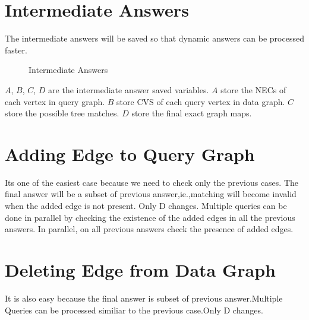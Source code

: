 \section{Intermediate Answers}
	\hspace{10mm}The intermediate answers will be saved so that dynamic answers can be processed faster.
	\begin{figure}[h]
 \centering
{}

 \caption{Intermediate Answers}
\end{figure}
	 $A$, $B$, $C$, $D$ are the intermediate answer saved variables. $A$ store the NECs of each vertex in query graph. $B$ store CVS of each query vertex in data graph. $C$ store the possible tree matches. $D$ store the final exact graph maps.
\section{Adding Edge to Query Graph}
 \label{sec:aq}
	\hspace{10mm} Its one of the easiest case because we need to check only the previous cases. The final answer will be a subset of previous answer,ie.,matching will become invalid when the added edge is not present. Only D changes. Multiple queries can be done in parallel  by checking the existence of the added edges in all the previous answers. In parallel, on all previous answers check the presence of added edges.
\section{Deleting Edge from Data Graph}
 \label{sec:dd}
	\hspace{10mm} It is also easy because the final answer is subset of previous answer.Multiple Queries can be processed similiar to the previous case.Only D changes.
